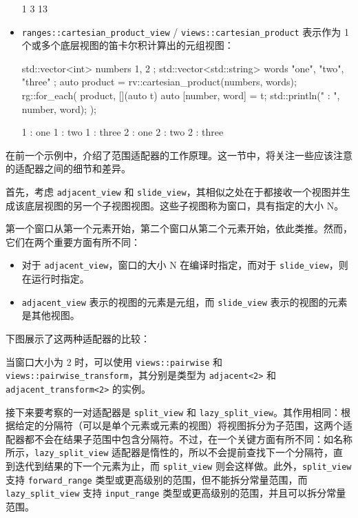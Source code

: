 \begin{itemize}
\begin{shell}
1 3 13
\end{shell}

\item
\verb|ranges::cartesian_product_view| / \verb|views::cartesian_product| 表示作为 1 个或多个底层视图的笛卡尔积计算出的元组视图：

\begin{cpp}
std::vector<int> numbers{ 1, 2 };
std::vector<std::string> words{ "one", "two", "three" };
auto product = rv::cartesian_product(numbers, words);
rg::for_each(
    product,
    [](auto t) {
        auto [number, word] = t;
        std::println("{} : {}", number, word);
    });
\end{cpp}

\begin{shell}
1 : one
1 : two
1 : three
2 : one
2 : two
2 : three
\end{shell}
\end{itemize}


在前一个示例中，介绍了范围适配器的工作原理。这一节中，将关注一些应该注意的适配器之间的细节和差异。

首先，考虑 \verb|adjacent_view| 和 \verb|slide_view|，其相似之处在于都接收一个视图并生成该底层视图的另一个子视图视图。这些子视图称为窗口，具有指定的大小 N。

第一个窗口从第一个元素开始，第二个窗口从第二个元素开始，依此类推。然而，它们在两个重要方面有所不同：

\begin{itemize}
\item
对于 \verb|adjacent_view|，窗口的大小 N 在编译时指定，而对于 \verb|slide_view|，则在运行时指定。

\item
\verb|adjacent_view| 表示的视图的元素是元组，而 \verb|slide_view| 表示的视图的元素是其他视图。
\end{itemize}

下图展示了这两种适配器的比较：


当窗口大小为 2 时，可以使用 \verb|views::pairwise| 和 \verb|views::pairwise_transform|，其分别是类型为 \verb|adjacent<2>| 和 \verb|adjacent_transform<2>| 的实例。

接下来要考察的一对适配器是 \verb|split_view| 和 \verb|lazy_split_view|。其作用相同：根据给定的分隔符（可以是单个元素或元素的视图）将视图拆分为子范围，这两个适配器都不会在结果子范围中包含分隔符。不过，在一个关键方面有所不同：如名称所示，\verb|lazy_split_view| 适配器是惰性的，所以不会提前查找下一个分隔符，直到迭代到结果的下一个元素为止，而 \verb|split_view| 则会这样做。此外，\verb|split_view| 支持 \verb|forward_range| 类型或更高级别的范围，但不能拆分常量范围，而 \verb|lazy_split_view| 支持 \verb|input_range| 类型或更高级别的范围，并且可以拆分常量范围。


